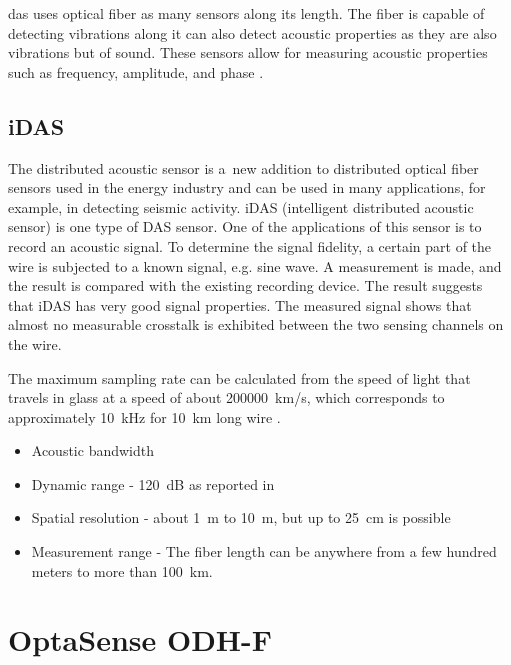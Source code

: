 \ac{das} uses optical fiber as many sensors along its length. The fiber is  capable of detecting vibrations along it can also detect acoustic properties as they are also vibrations but of sound. These sensors allow for measuring acoustic properties such as frequency, amplitude, and phase \cite{WangYu2017RDVM}. 


\subsection{iDAS}\label{txt.idas}


The distributed acoustic sensor is a~new addition to distributed optical fiber sensors used in the energy industry and can be used in many applications, for example, in detecting seismic activity. iDAS (intelligent distributed acoustic sensor) is one type of DAS sensor. One of the applications of this sensor is to record an acoustic signal. To determine the signal fidelity, a certain part of the wire is subjected to a known signal, e.g. sine wave. A measurement is made, and the result is compared with the existing recording device. The result suggests that iDAS has very good signal properties. The measured signal shows that almost no measurable crosstalk is exhibited between the two sensing channels on the wire.

The maximum sampling rate can be calculated from the speed of light that travels in glass at a speed of about \qty{200000}{\km/\s}, which corresponds to approximately \qty{10}{\kHz} for \qty{10}{\km} long wire \cite{WangYu2017RDVM}.


\begin{itemize}
    \item Acoustic bandwidth
    \item Dynamic range - \qty{120}{\dB} as reported in \cite{dasseismic}
    \item Spatial resolution - about \qty{1}{\m} to \qty{10}{\m}, but up to \qty{25}{\cm} is possible
    \item Measurement range - The fiber length can be anywhere from a few hundred meters to more than \qty{100}{\km}.
\end{itemize}


\section{OptaSense ODH-F}\label{txt.optasense}

